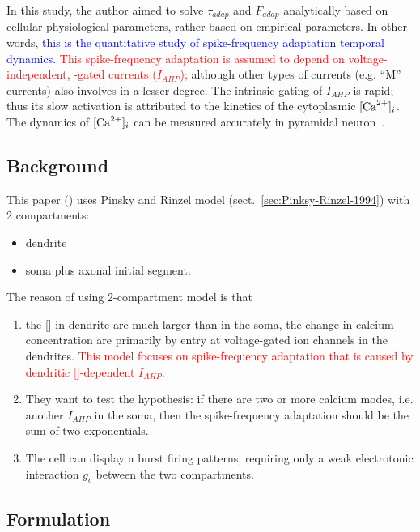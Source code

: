 In this study, the author \citep{wang1998cca} aimed to solve $\tau_{adap}$ and
$F_{adap}$ analytically based on cellular physiological parameters, rather based
on empirical parameters. In other words, \textcolor{blue}{this is the
quantitative study of spike-frequency
  adaptation temporal dynamics}.
\textcolor{red}{This spike-frequency adaptation is assumed to depend on
voltage-independent, -gated  currents ($I_{AHP}$);} although
other types of  currents (e.g. ``M'' currents) also involves in a lesser
degree. The intrinsic gating of $I_{AHP}$ is rapid; thus its slow activation is
attributed to the kinetics of the cytoplasmic $[\ce{Ca^2+}]_i$. The dynamics of
$[\ce{Ca^2+}]_i$ can be measured accurately in pyramidal
neuron~\citep{helmchen1996cba}.

\subsection{Background}
\label{sec:background}

This paper (\citep{wang1998cca}) uses Pinsky and Rinzel model
(sect.~\ref{sec:Pinksy-Rinzel-1994}) with 2 compartments:
\begin{itemize}
\item dendrite
\item soma plus axonal initial segment.
\end{itemize}
The reason of using 2-compartment model is that 
\begin{enumerate}
\item the [] in dendrite are much larger than in the soma,
  the change in calcium concentration are primarily by 
  entry at voltage-gated  ion channels in the dendrites.
  \textcolor{red}{This model focuses on spike-frequency adaptation
    that is caused by dendritic []-dependent $I_{AHP}$}.
\item They want to test the hypothesis: if there are two or more
  calcium modes, i.e. another $I_{AHP}$ in the soma, then the
  spike-frequency adaptation should be the sum of two exponentials.

\item The cell can display a burst firing patterns, requiring only a
  weak electrotonic interaction $g_c$ between the two compartments.
\end{enumerate}

\subsection{Formulation}
\label{sec:formulation}


